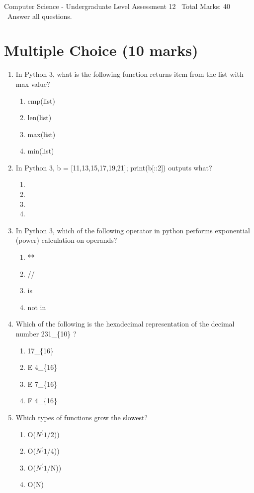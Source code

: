 \documentclass[12pt]{article}
\begin{document}
\begin{center}
Computer Science - Undergraduate Level Assessment 12 \
Total Marks: 40 \
Answer all questions.
\end{center}

\section*{Multiple Choice (10 marks)}
\begin{enumerate}[label=\arabic*.]
\item In Python 3, what is the following function returns item from the list with max value?
\begin{enumerate}[label=(\alph*)]
    \item cmp(list)
    \item len(list)
    \item max(list)
    \item min(list)
\end{enumerate}
\item In Python 3, b = [11,13,15,17,19,21]; print(b[::2]) outputs what?
\begin{enumerate}[label=(\alph*)]
    \item [19,21]
    \item [11,15]
    \item [11,15,19]
    \item [13,17,21]
\end{enumerate}
\item In Python 3, which of the following operator in python performs exponential (power) calculation on operands?
\begin{enumerate}[label=(\alph*)]
    \item **
    \item //
    \item is
    \item not in
\end{enumerate}
\item Which of the following is the hexadecimal representation of the decimal number 231\_\{10\} ?
\begin{enumerate}[label=(\alph*)]
    \item 17\_\{16\}
    \item E 4\_\{16\}
    \item E 7\_\{16\}
    \item F 4\_\{16\}
\end{enumerate}
\item Which types of functions grow the slowest?
\begin{enumerate}[label=(\alph*)]
    \item O($N^(1$/2))
    \item O($N^(1$/4))
    \item O($N^(1$/N))
    \item O(N)
\end{enumerate}
\end{enumerate}
\end{document}
